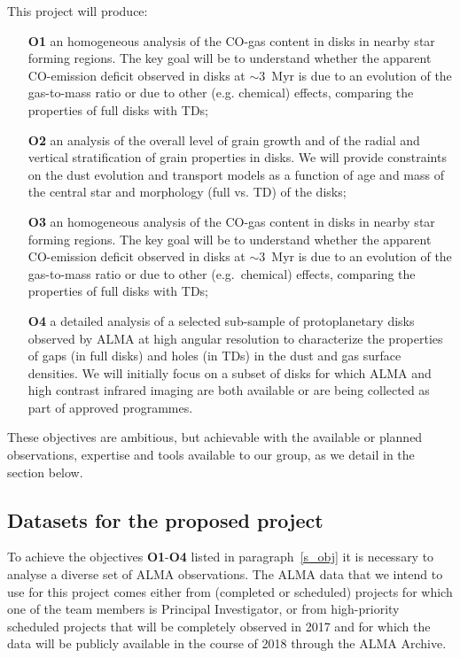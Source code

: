\documentclass[10pt,fleqn,twoside]{article}
\begin{document}
This project will produce:
\begin{itemize}
\item[{\bf O1}] an homogeneous analysis of the CO-gas content in disks in nearby star forming regions. The key goal will be to understand whether the apparent CO-emission deficit observed in disks at $\sim$3~Myr is due to an evolution of the gas-to-mass ratio or due to other (e.g. chemical) effects, comparing the properties of full disks with TDs;
\item[{\bf O2}] an analysis of the overall level of grain growth and of the radial and vertical stratification of grain properties in disks. We will provide constraints on the dust evolution and transport models as a function of age and mass of the central star and morphology (full vs. TD) of the disks;
\item[{\bf O3}] an homogeneous analysis of the CO-gas content in disks in nearby star forming regions. The key goal will be to understand whether the apparent CO-emission deficit observed in disks at $\sim$3~Myr is due to an evolution of the gas-to-mass ratio or due to other (e.g.\ chemical) effects, comparing the properties of full disks with TDs;
\item[{\bf O4}] a detailed analysis of a selected sub-sample of protoplanetary disks observed by ALMA at high angular resolution to characterize the properties of gaps (in full disks) and holes (in TDs) in the dust and gas surface densities. We will initially focus on a subset of disks for which ALMA and high contrast infrared imaging are both available or are being collected as part of approved programmes. 
\end{itemize}

These objectives are ambitious, but achievable with the available or planned observations, expertise and tools available to our group, as we detail in the section below.

\subsection{Datasets for the proposed project}
\label{s_data}

To achieve the objectives {\bf O1}-{\bf O4} listed in paragraph~\ref{s_obj} it is necessary to analyse a diverse set of ALMA observations. The ALMA data that we intend to use for this project comes either from (completed or scheduled) projects for which one of the team members is Principal Investigator, or from high-priority scheduled projects that will be completely observed in 2017 and for which the data will be publicly available in the course of 2018 through the ALMA Archive.
\end{document}
